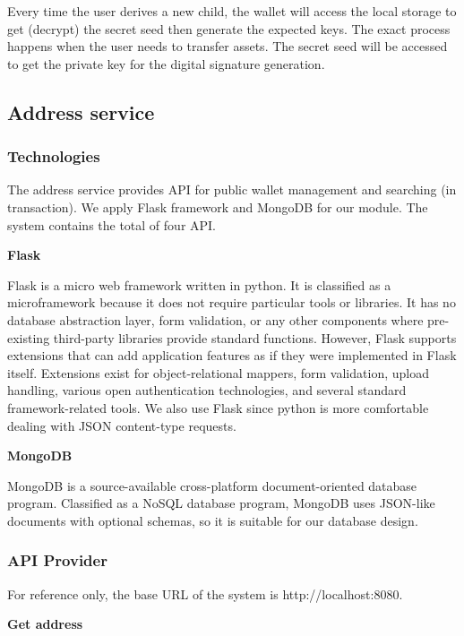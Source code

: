Every time the user derives a new child, the wallet will access the local storage to get (decrypt) the secret seed then generate the expected keys. The exact process happens when the user needs to transfer assets. The secret seed will be accessed to get the private key for the digital signature generation.


\subsection{Address service}

\label{address}
\subsubsection{Technologies}

The address service provides API for public wallet management and searching (in transaction). We apply Flask framework and MongoDB for our module. The system contains the total of four API.

\bigskip
{\textbf{Flask}}

Flask \cite{grinberg2018flask} is a micro web framework written in python. It is classified as a microframework because it does not require particular tools or libraries. It has no database abstraction layer, form validation, or any other components where pre-existing third-party libraries provide standard functions. However, Flask supports extensions that can add application features as if they were implemented in Flask itself. Extensions exist for object-relational mappers, form validation, upload handling, various open authentication technologies, and several standard framework-related tools. We also use Flask since python is more comfortable dealing with JSON content-type requests.


\bigskip
{\textbf{MongoDB}}

MongoDB \cite{mongo} is a source-available cross-platform document-oriented database program. Classified as a NoSQL database program, MongoDB uses JSON-like documents with optional schemas, so it is suitable for our database design.

\bigskip
\subsubsection{API Provider}

For reference only, the base URL of the system is http://localhost:8080.

{\textbf{Get address}}


